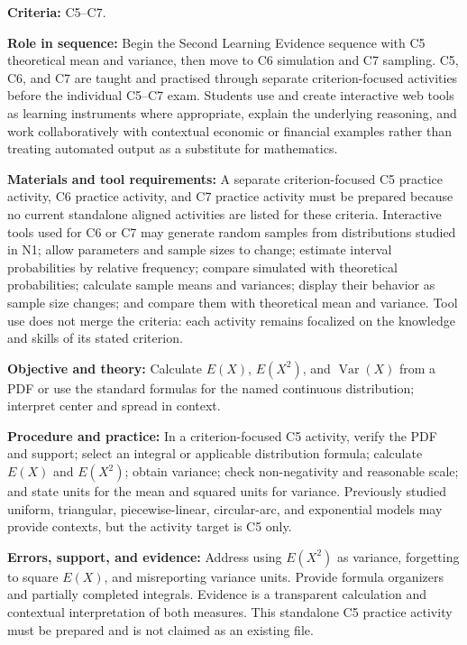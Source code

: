 \documentclass[10pt,letterpaper]{article}
\newcommand{\labelled}[2]{\textbf{#1:} #2\par}
\newcommand{\plansubsection}[1]{\Needspace{7\baselineskip}\par\vspace{5pt}{\normalsize\bfseries #1\par}\vspace{1pt}}
\newcommand{\criterionpart}[1]{\Needspace{10\baselineskip}\par\vspace{4pt}{\bfseries #1\par}}
\begin{document}
	\plansubsection{Pedagogical Action N2 -- Theoretical Moments, Simulation, and Sampling}
	\labelled{Criteria}{C5--C7.}
	\labelled{Role in sequence}{Begin the Second Learning Evidence sequence with C5 theoretical mean and variance, then move to C6 simulation and C7 sampling. C5, C6, and C7 are taught and practised through separate criterion-focused activities before the individual C5--C7 exam. Students use and create interactive web tools as learning instruments where appropriate, explain the underlying reasoning, and work collaboratively with contextual economic or financial examples rather than treating automated output as a substitute for mathematics.}
	\labelled{Materials and tool requirements}{A separate criterion-focused C5 practice activity, C6 practice activity, and C7 practice activity must be prepared because no current standalone aligned activities are listed for these criteria. Interactive tools used for C6 or C7 may generate random samples from distributions studied in N1; allow parameters and sample sizes to change; estimate interval probabilities by relative frequency; compare simulated with theoretical probabilities; calculate sample means and variances; display their behavior as sample size changes; and compare them with theoretical mean and variance. Tool use does not merge the criteria: each activity remains focalized on the knowledge and skills of its stated criterion.}
	
	\criterionpart{C5 -- Theoretical mean and variance}
	\labelled{Objective and theory}{Calculate $E(X)$, $E(X^2)$, and $\operatorname{Var}(X)$ from a PDF or use the standard formulas for the named continuous distribution; interpret center and spread in context.}
	\labelled{Procedure and practice}{In a criterion-focused C5 activity, verify the PDF and support; select an integral or applicable distribution formula; calculate $E(X)$ and $E(X^2)$; obtain variance; check non-negativity and reasonable scale; and state units for the mean and squared units for variance. Previously studied uniform, triangular, piecewise-linear, circular-arc, and exponential models may provide contexts, but the activity target is C5 only.}
	\labelled{Errors, support, and evidence}{Address using $E(X^2)$ as variance, forgetting to square $E(X)$, and misreporting variance units. Provide formula organizers and partially completed integrals. Evidence is a transparent calculation and contextual interpretation of both measures. This standalone C5 practice activity must be prepared and is not claimed as an existing file.}
	
\end{document}
